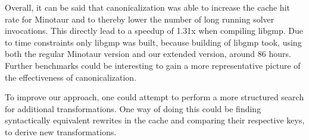 	Overall, it can be said that canonicalization was able to increase the cache hit rate for Minotaur and to thereby lower the number of long running solver invocations.
	This directly lead to a speedup of 1.31x when compiling libgmp.
	Due to time constraints only libgmp was built, because building of libgmp took, using both the regular Minotaur version and our extended version, around 86 hours.
	Further benchmarks could be interesting to gain a more representative picture of the effectiveness of canonicalization.

	To improve our approach, one could attempt to perform a more structured search for additional transformations.
	One way of doing this could be finding syntactically equivalent rewrites in the cache and comparing their respective keys, to derive new transformations.
 	
	\printbibliography
 	
 
 
 
